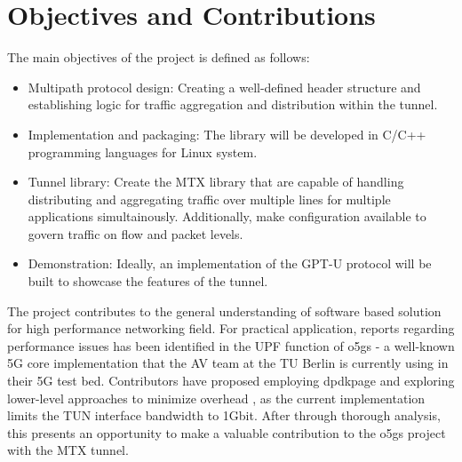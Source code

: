 \section{Objectives and Contributions}
The main objectives of the project is defined as follows:
\begin{itemize}
    \item Multipath protocol design: Creating a well-defined header structure and establishing logic for traffic aggregation and distribution within the tunnel.
    \item Implementation and packaging: The library will be developed in C/C++ programming languages for Linux system.
    \item Tunnel library: Create the MTX library that are capable of handling distributing and aggregating traffic over multiple lines for multiple applications simultainously. 
    Additionally, make configuration available to govern traffic on flow and packet levels.
    \item Demonstration: Ideally, an implementation of the GPT-U protocol will be built to showcase the features of the tunnel.
\end{itemize}

The project contributes to the general understanding of software based solution for high performance networking field.
For practical application, reports regarding performance issues has been identified in the \ac{UPF} function of \ac{o5gs} - a well-known 5G core implementation that the AV team at the TU Berlin is currently using in their 5G test bed. 
Contributors have proposed employing \ac{dpdkpage} and exploring lower-level approaches to minimize overhead \cite{open5gs_github_udp_perf_cap}\cite{open5gs_github_dpdk}, as the current implementation limits the TUN interface bandwidth to 1Gbit. 
After through thorough analysis, this presents an opportunity to make a valuable contribution to the \ac{o5gs} project with the MTX tunnel.


